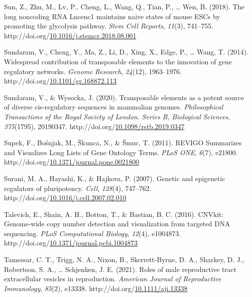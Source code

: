 \documentclass[12pt,twoside]{reedthesis}
\newlength{\cslhangindent}
\newenvironment{CSLReferences}[2] %
 {%
  \setlength{\parindent}{0pt}
  \ifodd #1 \everypar{\setlength{\hangindent}{\cslhangindent}}\ignorespaces\fi
  \ifnum #2 > 0
  \setlength{\parskip}{#2\baselineskip}
  \fi
 }%
 {}
\begin{document}
\begin{CSLReferences}{1}{0}
\leavevmode{}%
Sun, Z., Zhu, M., Lv, P., Cheng, L., Wang, Q., Tian, P., \ldots{} Wen, B. (2018). The long noncoding RNA Lncenc1 maintains naive states of mouse ESCs by promoting the glycolysis pathway. \emph{Stem Cell Reports}, \emph{11}(3), 741--755. http://doi.org/\href{https://doi.org/10.1016/j.stemcr.2018.08.001}{10.1016/j.stemcr.2018.08.001}

\leavevmode{}%
Sundaram, V., Cheng, Y., Ma, Z., Li, D., Xing, X., Edge, P., \ldots{} Wang, T. (2014). Widespread contribution of transposable elements to the innovation of gene regulatory networks. \emph{Genome Research}, \emph{24}(12), 1963--1976. http://doi.org/\href{https://doi.org/10.1101/gr.168872.113}{10.1101/gr.168872.113}

\leavevmode{}%
Sundaram, V., \& Wysocka, J. (2020). Transposable elements as a potent source of diverse cis-regulatory sequences in mammalian genomes. \emph{Philosophical Transactions of the Royal Society of London. Series B, Biological Sciences}, \emph{375}(1795), 20190347. http://doi.org/\href{https://doi.org/10.1098/rstb.2019.0347}{10.1098/rstb.2019.0347}

\leavevmode{}%
Supek, F., Bošnjak, M., Škunca, N., \& Šmuc, T. (2011). REVIGO Summarizes and Visualizes Long Lists of Gene Ontology Terms. \emph{PLoS ONE}, \emph{6}(7), e21800. http://doi.org/\href{https://doi.org/10.1371/journal.pone.0021800}{10.1371/journal.pone.0021800}

\leavevmode{}%
Surani, M. A., Hayashi, K., \& Hajkova, P. (2007). Genetic and epigenetic regulators of pluripotency. \emph{Cell}, \emph{128}(4), 747--762. http://doi.org/\href{https://doi.org/10.1016/j.cell.2007.02.010}{10.1016/j.cell.2007.02.010}

\leavevmode{}%
Talevich, E., Shain, A. H., Botton, T., \& Bastian, B. C. (2016). CNVkit: Genome-wide copy number detection and visualization from targeted DNA sequencing. \emph{PLoS Computational Biology}, \emph{12}(4), e1004873. http://doi.org/\href{https://doi.org/10.1371/journal.pcbi.1004873}{10.1371/journal.pcbi.1004873}

\leavevmode{}%
Tamessar, C. T., Trigg, N. A., Nixon, B., Skerrett-Byrne, D. A., Sharkey, D. J., Robertson, S. A., \ldots{} Schjenken, J. E. (2021). Roles of male reproductive tract extracellular vesicles in reproduction. \emph{American Journal of Reproductive Immunology}, \emph{85}(2), e13338. http://doi.org/\href{https://doi.org/10.1111/aji.13338}{10.1111/aji.13338}


\end{CSLReferences}
\end{document}
